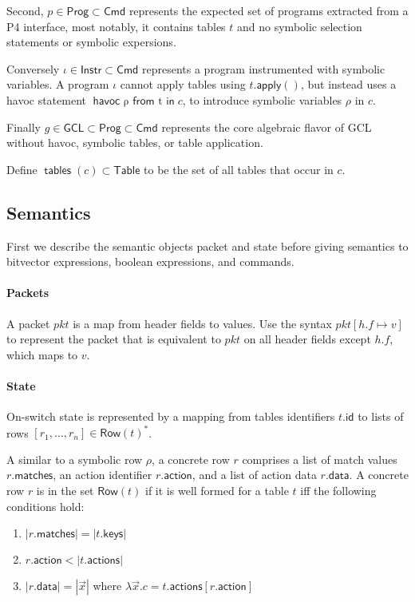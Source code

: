 \documentclass{article}
\newcommand{\pkt}{\mathit{pkt}}
\newcommand{\Cmd}{\mathsf{Cmd}}
\newcommand{\Instr}{\mathsf{Instr}}
\newcommand{\Prog}{\mathsf{Prog}}
\newcommand{\GCL}{\mathsf{GCL}}
\newcommand{\Table}{\mathsf{Table}}
\newcommand{\Row}{\mathsf{Row}}
\newcommand{\matches}{\mathsf{matches}}
\newcommand{\action}{\mathsf{action}}
\newcommand{\actions}{\mathsf{actions}}
\newcommand{\keys}{\mathsf{keys}}
\newcommand{\data}{\mathsf{data}}
\newcommand{\id}{\mathsf{id}}
\newcommand{\apply}{\mathsf{apply}}
\renewcommand{\choose}[2]{\mathop{\mathsf{havoc}~#1~\mathsf{from}~#2~\mathsf{in}}}
\newcommand{\tables}{\mathop{\mathsf{tables}}}
\begin{document}
Second, $p \in \Prog \subset \Cmd$ represents the expected set of programs extracted from a
P4 interface, most notably, it contains tables $t$ and no symbolic selection
statements or symbolic expersions.

Conversely $\iota \in \Instr \subset \Cmd$ represents a program instrumented
with symbolic variables. A program $\iota$ cannot apply tables using
$t.\apply()$, but instead uses a havoc statement $\choose \rho t c$, to
introduce symbolic variables $\rho$ in $c$.

Finally $g \in \GCL \subset \Prog \subset \Cmd$ represents the core algebraic
flavor of GCL without havoc, symbolic tables, or table application.


Define $\tables(c) \subset \Table$ to be the set of all tables that occur in $c$.

\subsection{Semantics}

First we describe the semantic objects packet and state before giving semantics
to bitvector expressions, boolean expressions, and commands.

\paragraph{Packets}
A packet $\pkt$ is a map from header fields to values. Use the syntax $\pkt[h.f
  \mapsto v]$ to represent the packet that is equivalent to $\pkt$ on all header
fields except $h.f$, which maps to $v$.

\paragraph{State}
On-switch state is represented by a mapping from tables identifiers $t.\id$ to
lists of rows $[r_1,\ldots,r_n] \in \Row(t)^*$.

A similar to a symbolic row $\rho$, a concrete row $r$ comprises a list of match
values $r.\matches$, an action identifier $r.\action$, and a list of action data
$r.\data$. A concrete row $r$ is in the set $\Row(t)$ if it is well formed for a
table $t$ iff the following conditions hold:
\begin{enumerate}
\item $|r.\matches| = |t.\keys|$
\item $r.\action < |t.\actions|$
\item $|r.\data| = |\vec x|$ where $\lambda \vec x. c = t.\actions[r.\action]$
\end{enumerate}\
\end{document}
